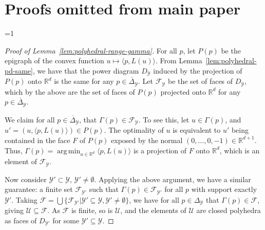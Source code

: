 \documentclass[12pt]{article}
\newcommand{\Comments}{1}
\newcommand{\mytodo}[2]{\ifnum\Comments=1%
  \todo[linecolor=#1!80!black,backgroundcolor=#1,bordercolor=#1!80!black]{#2}\fi}
\newcommand{\jessiet}[1]{\mytodo{purple!20!white}{JF: #1}}
\newcommand{\reals}{\mathbb{R}}
\newcommand{\simplex}{\Delta_\Y}
\newcommand{\F}{\mathcal{F}}
\newcommand{\U}{\mathcal{U}}
\newcommand{\Y}{\mathcal{Y}}
\newcommand{\inprod}[2]{\langle #1, #2 \rangle}%
\newcommand{\inter}[1]{\mathring{#1}}%
\DeclareMathOperator*{\argmin}{arg\,min}
\begin{document}
\section{Proofs omitted from main paper}\label{app:omitted-proofs}
\jessiet{Rename this section}
\begin{proof}[Proof of Lemma~\ref{lem:polyhedral-range-gamma}]
  For all $p$, let $P(p)$ be the epigraph of the convex function $u\mapsto \inprod{p}{L(u)}$.
  From Lemma~\ref{lem:polyhedral-pd-same}, we have that the power diagram $D_\Y$ induced by the projection of $P(p)$ onto $\reals^d$ is the same for any $p\in\inter\simplex$.
  Let $\F_\Y$ be the set of faces of $D_\Y$, which by the above are the set of faces of $P(p)$ projected onto $\reals^d$ for any $p\in\inter\simplex$.

  We claim for all $p\in\inter\simplex$, that $\Gamma(p) \in \F_\Y$.
  To see this, let $u \in \Gamma(p)$, and $u' = (u,\inprod{p}{L(u)}) \in P(p)$.
  The optimality of $u$ is equivalent to $u'$ being contained in the face $F$ of $P(p)$ exposed by the normal $(0,\ldots,0,-1)\in\reals^{d+1}$.
  Thus, $\Gamma(p) = \argmin_{u\in\reals^d} \inprod{p}{L(u)}$ is a projection of $F$ onto $\reals^d$, which is an element of $\F_\Y$.

  Now consider $\Y'\subset \Y$, $\Y'\neq\emptyset$.
  Applying the above argument, we have a similar guarantee: a finite set $\F_{\Y'}$ such that $\Gamma(p) \in \F_{\Y'}$ for all $p$ with support exactly $\Y'$.
  Taking $\F = \bigcup\{\F_{\Y'} | \Y'\subseteq\Y, \Y'\neq\emptyset\}$, we have for all $p\in\simplex$ that $\Gamma(p) \in \F$, giving $\U \subseteq \F$.
  As $\F$ is finite, so is $\U$, and the elements of $\U$ are closed polyhedra as faces of $D_{\Y'}$ for some $\Y'\subseteq\Y$.
\end{proof}
\end{document}
